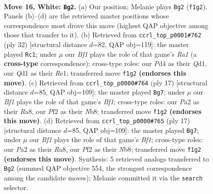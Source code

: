 \documentclass[11pt]{article}
\begin{document}
\clearpage

\begin{figure}[p]\centering
\begin{subfigure}{0.46\textwidth}\centering
\resizebox{\linewidth}{!}{%
\newchessgame
\chessboard[
  setfen={r1b1k2r/2p1qp2/2n2n2/p2p2p1/1p1P2Pp/5N1P/PPK1PP2/R2QBB1R w kq - 0 16},
  showmover=false,
  pgfstyle=straightmove, color=movearrow, markmove={f1-g2}
]}
\caption{}
\end{subfigure}\hfill
\begin{subfigure}{0.46\textwidth}\centering
\resizebox{\linewidth}{!}{%
\newchessgame
\chessboard[
  setfen={4k2r/1r1qbpp1/p1n1pn2/1p1p3p/1P1P4/P1N1P3/1B2BPPP/R2QR1K1 w k - 6 17},
  showmover=false,
  pgfstyle=straightmove, color=movearrow, markmove={a1-c1}
]}
\caption{}
\end{subfigure}
\\[4pt]
\begin{subfigure}{0.46\textwidth}\centering
\resizebox{\linewidth}{!}{%
\newchessgame
\chessboard[
  setfen={rnbqkb1r/5p1p/p2p1np1/1ppP4/4PB2/2N2N1P/PP3PP1/R2QKB1R b KQkq - 0 9},
  showmover=false,
  pgfstyle=straightmove, color=movearrow, markmove={f8-g7}
]}
\caption{}
\end{subfigure}\hfill
\begin{subfigure}{0.46\textwidth}\centering
\resizebox{\linewidth}{!}{%
\newchessgame
\chessboard[
  setfen={rnbqkb1r/5p1p/p2p1np1/1ppP4/4PB2/2N2N1P/PP3PP1/R2QKB1R b KQkq - 0 9},
  showmover=false,
  pgfstyle=straightmove, color=movearrow, markmove={f8-g7}
]}
\caption{}
\end{subfigure}
\caption{\textbf{Move 16, White: \texttt{Bg2}.} (a) Our position; Melanie plays \texttt{Bg2} (\texttt{f1g2}). Panels (b)--(d) are the retrieved master positions whose correspondence most drove this move (highest QAP objective among those that transfer to it). (b) Retrieved from \texttt{ccrl\_top\_p0001\#762} (ply 32) [structural distance $d$=82, QAP obj=119]: the master played \texttt{Rc1}; under $\mu$ our \emph{Bf1} plays the role of that game's \emph{Ra1} (a \textbf{cross-type} correspondence); cross-type roles: our \emph{P}d4 as their \emph{Q}d1, our \emph{Q}d1 as their \emph{R}e1; transferred move \texttt{f1g2} \textbf{(endorses this move)}. (c) Retrieved from \texttt{ccrl\_top\_p0000\#764} (ply 17) [structural distance $d$=85, QAP obj=109]: the master played \texttt{Bg7}; under $\mu$ our \emph{Bf1} plays the role of that game's \emph{Bf1}; cross-type roles: our \emph{P}a2 as their \emph{R}a8, our \emph{P}f2 as their \emph{N}b8; transferred move \texttt{f1g2} \textbf{(endorses this move)}. (d) Retrieved from \texttt{ccrl\_top\_p0000\#765} (ply 17) [structural distance $d$=85, QAP obj=109]: the master played \texttt{Bg7}; under $\mu$ our \emph{Bf1} plays the role of that game's \emph{Bf1}; cross-type roles: our \emph{P}a2 as their \emph{R}a8, our \emph{P}f2 as their \emph{N}b8; transferred move \texttt{f1g2} \textbf{(endorses this move)}. Synthesis: 5 retrieved analogs transferred to \texttt{Bg2} (summed QAP objective 554, the strongest correspondence among the candidate moves); Melanie committed it via the \texttt{search} selector.}
\label{fig:thought-m30}
\end{figure}
\end{document}
